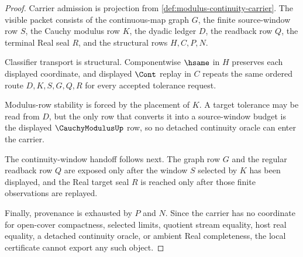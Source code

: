 \begin{proof}
Carrier admission is projection from \autoref{def:modulus-continuity-carrier}. The visible packet consists of the continuous-map graph $G$, the finite source-window row $S$, the Cauchy modulus row $K$, the dyadic ledger $D$, the readback row $Q$, the terminal Real seal $R$, and the structural rows $H,C,P,N$.

Classifier transport is structural. Componentwise $\hsame$ in $H$ preserves each displayed coordinate, and displayed $\Cont$ replay in $C$ repeats the same ordered route $D,K,S,G,Q,R$ for every accepted tolerance request.

Modulus-row stability is forced by the placement of $K$. A target tolerance may be read from $D$, but the only row that converts it into a source-window budget is the displayed $\CauchyModulusUp$ row, so no detached continuity oracle can enter the carrier.

The continuity-window handoff follows next. The graph row $G$ and the regular readback row $Q$ are exposed only after the window $S$ selected by $K$ has been displayed, and the Real target seal $R$ is reached only after those finite observations are replayed.

Finally, provenance is exhausted by $P$ and $N$. Since the carrier has no coordinate for open-cover compactness, selected limits, quotient stream equality, host real equality, a detached continuity oracle, or ambient Real completeness, the local certificate cannot export any such object.
\end{proof}

